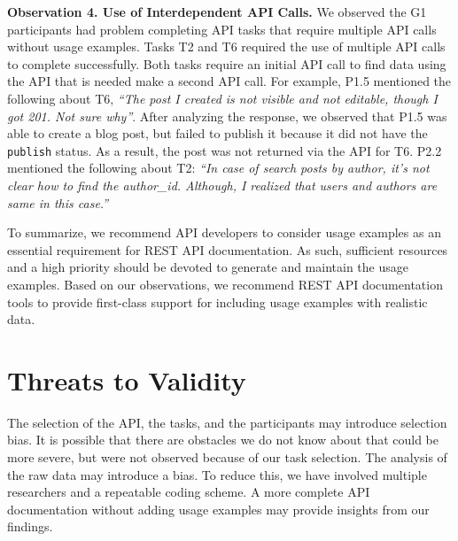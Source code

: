 \vspace{10mm}
\hspace{-5mm}
\vspace{10mm}

\textbf{Observation 4. Use of Interdependent API Calls.} We observed the G1 participants had problem completing API tasks that require multiple API calls without usage examples. Tasks T2 and T6 required the use of multiple API calls to complete successfully. Both tasks require an initial API call to find data using the API that is needed make a second API call. For example, P1.5 mentioned the following about T6, \textit{``The post I created is not visible and not editable, though I got 201. Not sure why''}. After analyzing the response, we observed that P1.5 was able to create a blog post, but failed to publish it because it did not have the \lstinline{publish} status. As a result, the post was not returned via the API for T6. P2.2 mentioned the following about T2: \textit{``In case of search posts by author, it's not clear how to find the author\_id. Although, I realized that users and authors are same in this case.''}

\vspace{10mm}
\hspace{-5mm}
\vspace{10mm}

To summarize, we recommend API developers to consider usage examples as an essential requirement for REST API documentation. As such, sufficient resources and a high priority should be devoted to generate and maintain the usage examples. Based on our observations, we recommend REST API documentation tools to provide first-class support for including usage examples with realistic data.

\section{Threats to Validity}
\label{sec:threat}
The selection of the API, the tasks, and the participants may introduce selection bias. It is possible that there are obstacles we do not know about that could be more severe, but were not observed because of our task selection. The analysis of the raw data may introduce a bias. To reduce this, we have involved multiple researchers and a repeatable coding scheme. A more complete API documentation without adding usage examples may provide  insights from our findings.

